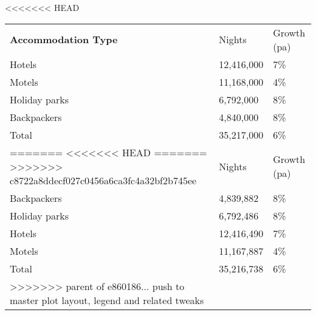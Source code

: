 <<<<<<< HEAD
\begin{tabular}[t]{p{4.5cm}>{\hfill}p{1.3cm}>{\hfill}p{1.7cm}}
 \textbf{Accommodation Type} & Nights & Growth (pa) \\ 
 Hotels & 12,416,000 & 7\% \\ 
  Motels & 11,168,000 & 4\% \\ 
  Holiday parks &  6,792,000 & 8\% \\ 
  Backpackers &  4,840,000 & 8\% \\ 
  Total & 35,217,000 & 6\% \\ 
=======
<<<<<<< HEAD
=======
>>>>>>> c8722a8ddecf027c0456a6ca3fc4a32bf2b745ee
\begin{tabular}[t]{p{4.8cm}>{\hfill}p{1.3cm}>{\hfill}p{1.4cm}}
 \textbf{Accommodation Type} & Nights & Growth (pa) \\ 
 Backpackers &  4,839,882 & 8\% \\ 
  Holiday parks &  6,792,486 & 8\% \\ 
  Hotels & 12,416,490 & 7\% \\ 
  Motels & 11,167,887 & 4\% \\ 
  Total & 35,216,738 & 6\% \\ 
>>>>>>> parent of e860186... push to master plot layout, legend and related tweaks
  \end{tabular}
